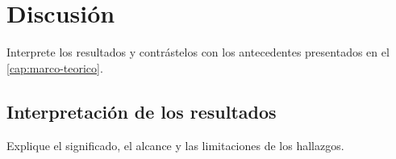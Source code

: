 \chapter{Discusión}
\label{cap:discusion}

Interprete los resultados y contrástelos con los antecedentes presentados en
el \cref{cap:marco-teorico}.

\section{Interpretación de los resultados}

Explique el significado, el alcance y las limitaciones de los hallazgos.
